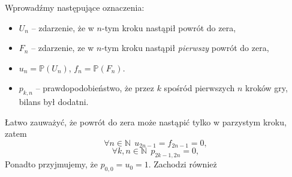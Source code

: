 \documentclass[a4paper,11pt,oneside]{book}
\newcommand{\Prob}{\mathbb{P}}
\theoremstyle{definition}
\begin{document}
Wprowadźmy następujące oznaczenia:
\begin{itemize}
  \setlength\itemsep{1pt}
 \item $U_n$ -- zdarzenie, że w $n$-tym kroku nastąpił powrót do zera,
 \item $F_n$ -- zdarzenie, ze w $n$-tym kroku nastąpił \emph{pierwszy} powrót do zera,
 \item $u_n = \Prob(U_n)$, $f_n = \Prob(F_n)$.
 \item $p_{k,n}$ -- prawdopodobieństwo, że przez $k$ spośród pierwszych $n$ kroków gry, bilans był dodatni.
\end{itemize}
Łatwo zauważyć, że powrót do zera może nastąpić tylko w parzystym kroku, zatem
\[ \forall n \in \mathbb{N}\ \ u_{2n-1} = f_{2n-1} = 0, \]
\[ \forall k,n \in \mathbb{N}\ \ p_{2k-1, 2n} = 0, \]
Ponadto przyjmujemy, że $p_{0,0} = u_0 = 1$. Zachodzi również
\end{document}
